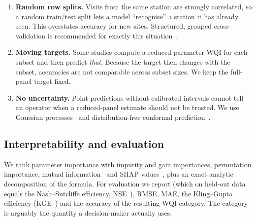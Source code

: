 \begin{enumerate}
  \item \textbf{Random row splits.} Visits from the same station are strongly correlated, so a random train/test split lets a model ``recognise'' a station it has already seen. This overstates accuracy for new sites. Structured, grouped cross-validation is recommended for exactly this situation~\citep{roberts2017}.
  \item \textbf{Moving targets.} Some studies compute a reduced-parameter WQI for each subset and then predict \emph{that}. Because the target then changes with the subset, accuracies are not comparable across subset sizes. We keep the full-panel target fixed.
  \item \textbf{No uncertainty.} Point predictions without calibrated intervals cannot tell an operator when a reduced-panel estimate should not be trusted. We use Gaussian processes~\citep{rasmussen2006} and distribution-free conformal prediction~\citep{vovk2005,romano2019,barber2021}.
\end{enumerate}

\subsection{Interpretability and evaluation}

We rank parameter importance with impurity and gain importances, permutation importance, mutual information~\citep{kraskov2004} and SHAP values~\citep{lundberg2017}, plus an exact analytic decomposition of the formula. For evaluation we report \R{} (which on held-out data equals the Nash--Sutcliffe efficiency, NSE~\citep{nash1970}), RMSE, MAE, the Kling--Gupta efficiency (KGE~\citep{gupta2009}) and the accuracy of the resulting WQI category. The category is arguably the quantity a decision-maker actually uses.
